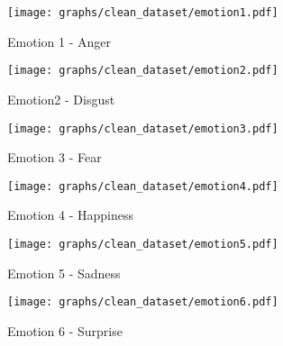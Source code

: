 \newpage

\begin{figure}[!ht]
\center
	\caption{Emotion 1 - Anger}  
	\texttt{[image: graphs/clean\_dataset/emotion1.pdf]}
	 
	
   \label{fig:decisionTrees1}
\end{figure}

\begin{figure}[!ht]
\center
	\caption{Emotion2 - Disgust}  
	\texttt{[image: graphs/clean\_dataset/emotion2.pdf]}
	 
	
   \label{fig:decisionTrees2}
\end{figure}

\begin{figure}[!ht]
\center
	\caption{Emotion 3 - Fear}  
	\texttt{[image: graphs/clean\_dataset/emotion3.pdf]}
	 
	
   \label{fig:decisionTrees3}
\end{figure}

\begin{figure}[!ht]
\center
	\caption{Emotion 4 - Happiness}  
	\texttt{[image: graphs/clean\_dataset/emotion4.pdf]}
	 
	
   \label{fig:decisionTrees4}
\end{figure}

\begin{figure}[!ht]
\center
	\caption{Emotion 5 - Sadness}  
	\texttt{[image: graphs/clean\_dataset/emotion5.pdf]}
	 
	
   \label{fig:decisionTrees5}
\end{figure}

\begin{figure}[!ht]
\center
	\caption{Emotion 6 - Surprise}  
	\texttt{[image: graphs/clean\_dataset/emotion6.pdf]}
	 
	
   \label{fig:decisionTrees6}
\end{figure}
